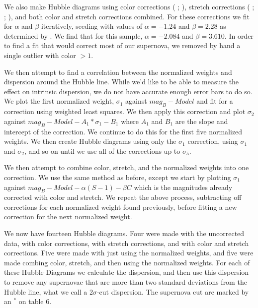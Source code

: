 We also make Hubble diagrams using color corrections (\citeauthor{astier06a} \citeyear{astier06a}; \citeauthor{sullivan03a} \citeyear{sullivan03a}), stretch corrections (\citeauthor{perlmutter97a} \citeyear{perlmutter97a}; \citeauthor{perlmutter99a} \citeyear{perlmutter99a}; \citeauthor{knop03} \citeyear{knop03}), and both color and stretch corrections combined. For these corrections we fit for $\alpha$ and $\beta$ iteratively, seeding with values of $\alpha = -1.24$ and $\beta = 2.28$ as determined by \citet{kowalski08a}. We find that for this sample, $\alpha = -2.084$ and $\beta = 3.610$. In order to find a fit that would correct most of our supernova, we removed by hand a single outlier with color $> 1$.

We then attempt to find a correlation between the normalized weights and dispersion around the Hubble line. While we'd like to be able to measure the effect on intrinsic dispersion, we do not have accurate enough error bars to do so. We plot the first normalized weight, $\sigma_{1}$ against $mag_{B} - Model$ and fit for a correction using weighted least squares. We then apply this correction and plot $\sigma_{2}$ against $mag_{B} - Model - A_{1}*\sigma_{1} - B_{1}$ where $A_{1}$ and $B_{1}$ are the slope and intercept of the correction. We continue to do this for the first five normalized weights. We then create Hubble diagrams using only the $\sigma_{1}$ correction, using $\sigma_{1}$ and $\sigma_{2}$, and so on until we use all of the corrections up to $\sigma_{5}$.

We then attempt to combine color, stretch, and the normalized weights into one correction. We use the same method as before, except we start by plotting $\sigma_{1}$ against $mag_{B} - Model - \alpha (S - 1) - \beta C$ which is the magnitudes already corrected with color and stretch. We repeat the above process, subtracting off corrections for each normalized weight found previously, before fitting a new correction for the next normalized weight.

We now have fourteen Hubble diagrams. Four were made with the uncorrected data, with color corrections, with stretch corrections, and with color and stretch corrections. Five were made with just using the normalized weights, and five were made combing color, stretch, and then using the normalized weights. For each of these Hubble Diagrams we calculate the dispersion, and then use this dispersion to remove any supernovae that are more than two standard deviations from the Hubble line, what we call a 2$\sigma$-cut dispersion. The supernova cut are marked by an $^{*}$ on table 6.

